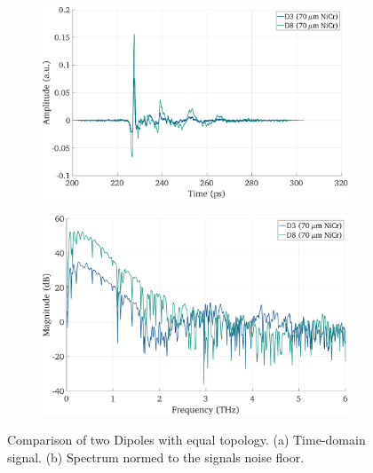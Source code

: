 \begin{figure}[!tbp]
    \centering
    \begin{subfigure}[b]{0.485\textwidth}
        \centering
        \includegraphics[width=\textwidth]{figures/Results/D3_D8/D3_D8_time.pdf}
        \caption{}
    \end{subfigure}
    \hfill
    \begin{subfigure}[b]{0.485\textwidth}
        \centering
        \includegraphics[width=\textwidth]{figures/Results/D3_D8/D3_D8_spectrum_nn.pdf}
        \caption{}
    \end{subfigure}
    \caption{Comparison of two Dipoles with equal topology. (a) Time-domain signal. (b) Spectrum normed to the signals noise floor.}
\end{figure}

